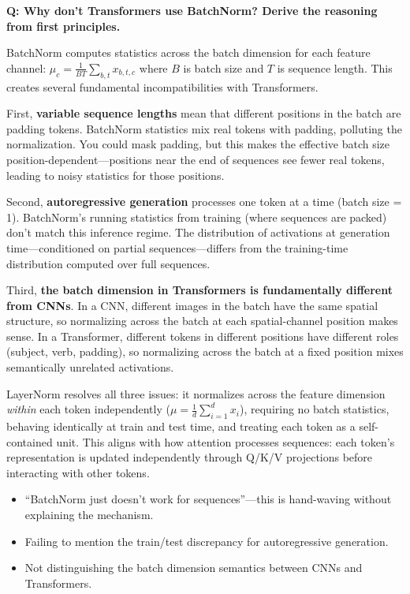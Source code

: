\begin{interviewq}
\textbf{Q: Why don't Transformers use BatchNorm? Derive the reasoning from first principles.}

 \quad {} \quad \badgefreq{\freqmed}

\stronganswer

BatchNorm computes statistics across the batch dimension for each feature channel: $\mu_c = \frac{1}{BT}\sum_{b,t} x_{b,t,c}$ where $B$ is batch size and $T$ is sequence length. This creates several fundamental incompatibilities with Transformers.

First, \textbf{variable sequence lengths} mean that different positions in the batch are padding tokens. BatchNorm statistics mix real tokens with padding, polluting the normalization. You could mask padding, but this makes the effective batch size position-dependent---positions near the end of sequences see fewer real tokens, leading to noisy statistics for those positions.

Second, \textbf{autoregressive generation} processes one token at a time (batch size = 1). BatchNorm's running statistics from training (where sequences are packed) don't match this inference regime. The distribution of activations at generation time---conditioned on partial sequences---differs from the training-time distribution computed over full sequences.

Third, \textbf{the batch dimension in Transformers is fundamentally different from CNNs}. In a CNN, different images in the batch have the same spatial structure, so normalizing across the batch at each spatial-channel position makes sense. In a Transformer, different tokens in different positions have different roles (subject, verb, padding), so normalizing across the batch at a fixed position mixes semantically unrelated activations.

LayerNorm resolves all three issues: it normalizes across the feature dimension \textit{within} each token independently ($\mu = \frac{1}{d}\sum_{i=1}^d x_i$), requiring no batch statistics, behaving identically at train and test time, and treating each token as a self-contained unit. This aligns with how attention processes sequences: each token's representation is updated independently through Q/K/V projections before interacting with other tokens.

\redflags
\begin{itemize}
    \item ``BatchNorm just doesn't work for sequences''---this is hand-waving without explaining the mechanism.
    \item Failing to mention the train/test discrepancy for autoregressive generation.
    \item Not distinguishing the batch dimension semantics between CNNs and Transformers.
\end{itemize}


\end{interviewq}
